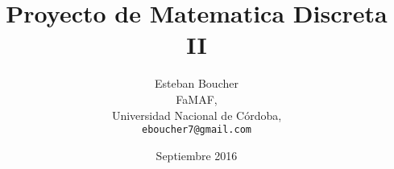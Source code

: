 \documentclass[12pt,a4paper]{report}
\begin{document}
\begin{titlepage}
	\centering
	\title{Proyecto de Matematica Discreta II}
	\author{Esteban Boucher\\
	  FaMAF,\\
	  Universidad Nacional de Córdoba,\\
	\texttt{eboucher7@gmail.com}}
	\date{Septiembre 2016}
	\maketitle
\end{titlepage}
\end{document}
